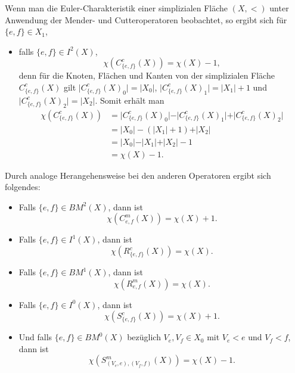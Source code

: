 \documentclass[12pt,titlepage]{article}
\begin{document}
Wenn man die Euler-Charakteristik einer simplizialen Fläche $(X,<)$ unter Anwendung der Mender- und Cutteroperatoren beobachtet, so ergibt sich für $\{e,f\} \in X_1$, 
\begin{itemize}
\item falls $\{e,f\} \in I^2(X)$,  
\[
\chi(C^c_{\{e,f\}}(X))=\chi(X)-1,
\]
denn für die Knoten, Flächen und Kanten von der simplizialen Fläche $C^c_{\{e,f\}}(X)$ gilt $\vert C^c_{\{e,f\}}(X)_0 \vert =\vert X_0\vert $, $\vert C^c_{\{e,f\}}(X)_1 \vert =\vert X_1\vert +1$ und $\vert C^c_{\{e,f\}}(X)_2 \vert =\vert X_2\vert $. Somit erhält man 
\begin{align*}
\chi(C^c_{\{e,f\}}(X))&=\vert C^c_{\{e,f\}}(X)_0 \vert-\vert C^c_{\{e,f\}}(X)_1 \vert+\vert C^c_{\{e,f\}}(X)_2 \vert\\
&=\vert X_0\vert-(\vert X_1\vert+1)+\vert X_2\vert\\
&=\vert X_0\vert-\vert X_1\vert+\vert X_2\vert -1\\
&=\chi(X)-1.
\end{align*}
\end{itemize}
Durch analoge Herangehensweise bei den anderen Operatoren ergibt sich folgendes:
\begin{itemize}
\item Falls $\{e,f\} \in BM^2(X)$, dann ist 
\[
\chi(C^m_{e,f}(X))=\chi(X)+1.
\]
\item Falls $\{e,f\} \in I^1(X)$, dann ist 
\[
\chi(R^c_{\{e,f\}}(X))=\chi(X).
\]
\item Falls $\{e,f\} \in BM^1(X)$, dann ist 
\[
\chi(R^m_{e,f}(X))=\chi(X).
\]
\item Falls $\{e,f\} \in I^0(X)$, dann ist 
\[
\chi(S^c_{\{e,f\}}(X))=\chi(X)+1.
\]
\item Und falls $\{e,f\} \in BM^0(X)$ bezüglich $V_e,V_f \in X_0$ mit $V_e<e$ und $V_f<f$, dann ist 
\[
\chi(S^m_{(V_e,e),(V_f,f)}(X))=\chi(X)-1.
\]
\end{itemize}
\newpage
\end{document}
